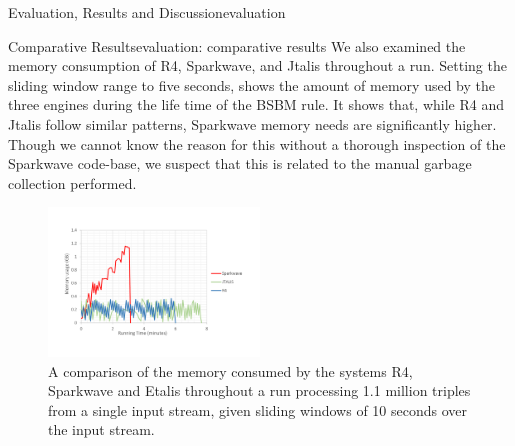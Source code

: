 \begin{nestedsection}{Evaluation, Results and Discussion}{evaluation}
\begin{nestedsection}{Comparative Results}{evaluation: comparative results}
		We also examined the memory consumption of R4, Sparkwave, and Jtalis throughout a run.
		Setting the sliding window range to five seconds,  shows the amount of memory used by the three engines during the life time of the BSBM rule.
		It shows that, while R4 and Jtalis follow similar patterns, Sparkwave memory needs are significantly higher.
		Though we cannot know the reason for this without a thorough inspection of the Sparkwave code-base, we suspect that this is related to the manual garbage collection performed.
		\begin{figure}
			\centering
			\includegraphics[width=0.5\textwidth]{memoryConsumptionComparison}
			\caption{A comparison of the memory consumed by the systems R4, Sparkwave and Etalis throughout a run processing 1.1 million triples from a single input stream, given sliding windows of 10 seconds over the input stream.}
		\end{figure}
	\end{nestedsection}

\end{nestedsection}

